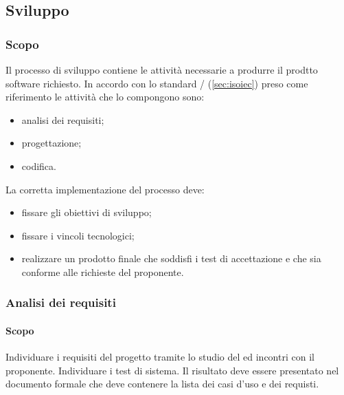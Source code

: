     \subsection{Sviluppo}
        \subsubsection{Scopo}
	        Il processo di sviluppo contiene le attività necessarie a produrre il prodtto software richiesto. In accordo con lo standard / (\ref{sec:isoiec}) preso come riferimento le attività che lo compongono sono:
        \begin{itemize}
            \item analisi dei requisiti;
            \item progettazione;
            \item codifica.
        \end{itemize}
        La corretta implementazione del processo deve:
        \begin{itemize}
            \item fissare gli obiettivi di sviluppo;
            \item fissare i vincoli tecnologici;
            \item realizzare un prodotto finale che soddisfi i test di accettazione e che sia conforme alle richieste del proponente.
        \end{itemize}
        \subsubsection{Analisi dei requisiti}
            \paragraph{Scopo}
            Individuare i requisiti del progetto tramite lo studio del  ed incontri con il proponente. Individuare i test di sistema. Il risultato deve essere presentato nel documento formale \adr{} che deve contenere la lista dei casi d'uso e dei requisti.
